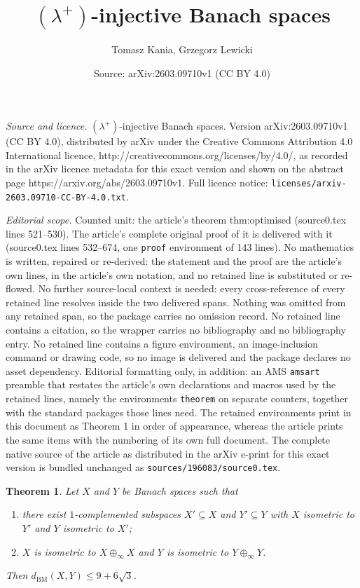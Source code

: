 \documentclass[10pt,a4paper]{amsart}
\title{$(\lambda^+)$-injective Banach spaces}
\author{Tomasz Kania, Grzegorz Lewicki}
\date{Source: arXiv:2603.09710v1 (CC BY 4.0)}
\newtheorem{theorem}{Theorem}
\newcommand{\BM}{\mathrm{BM}}
\newcommand{\dist}{d_{\BM}}
\renewcommand{\le}{\leqslant}
\begin{document}
\maketitle

\noindent\emph{Source and licence.} $(\lambda^+)$-injective Banach spaces. Version arXiv:2603.09710v1 (CC BY 4.0), distributed by arXiv under the Creative Commons Attribution 4.0 International licence, http://creativecommons.org/licenses/by/4.0/, as recorded in the arXiv licence metadata for this exact version and shown on the abstract page https://arxiv.org/abs/2603.09710v1. Full licence notice: \texttt{licenses/arxiv-2603.09710-CC-BY-4.0.txt}.\par\smallskip

\noindent\textit{Editorial scope.} Counted unit: the article's theorem thm:optimised (source0.tex lines 521--530). The article's complete original proof of it is delivered with it (source0.tex lines 532--674, one \texttt{proof} environment of 143 lines). No mathematics is written, repaired or re-derived: the statement and the proof are the article's own lines, in the article's own notation, and no retained line is substituted or re-flowed.  No further source-local context is needed: every cross-reference of every retained line resolves inside the two delivered spans.  Nothing was omitted from any retained span, so the package carries no omission record.  No retained line contains a citation, so the wrapper carries no bibliography and no bibliography entry.  No retained line contains a figure environment, an image-inclusion command or drawing code, so no image is delivered and the package declares no asset dependency.  Editorial formatting only, in addition: an AMS \texttt{amsart} preamble that restates the article's own declarations and macros used by the retained lines, namely the environments \texttt{theorem} on separate counters, together with the standard packages those lines need.  The retained environments print in this document as Theorem 1 in order of appearance, whereas the article prints the same items with the numbering of its own full document.  The complete native source of the article as distributed in the arXiv e-print for this exact version is bundled unchanged as \texttt{sources/196083/source0.tex}.
\begin{theorem}\label{thm:optimised}
Let $X$ and $Y$ be Banach spaces such that
\begin{enumerate}[label=\textup{(\roman*)}]
\item there exist $1$-complemented subspaces $X'\subseteq X$ and
$Y'\subseteq Y$ with $X$ isometric to $Y'$ and $Y$ isometric to $X'$;
\item $X$ is isometric to $X\oplus_\infty X$ and $Y$ is isometric
to $Y\oplus_\infty Y$.
\end{enumerate}
Then $\dist(X,Y)\le 9+6\sqrt{3}$.
\end{theorem}
\end{document}

